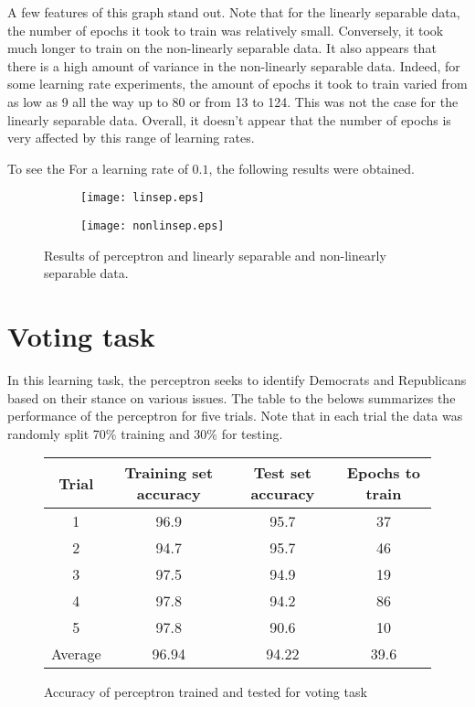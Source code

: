 \documentclass[12pt,letterpaper]{article}
\begin{document}
A few features of this graph stand out. Note that for the linearly separable data, the number of epochs it took to train was relatively small. Conversely, it took much longer to train on the non-linearly separable data. It also appears that there is a high amount of variance in the non-linearly separable data. Indeed, for some learning rate experiments, the amount of epochs it took to train varied from as low as 9 all the way up to 80 or from 13 to 124. This was not the case for the linearly separable data. Overall, it doesn't appear that the number of epochs is very affected by this range of learning rates.


To see the For a learning rate of $0.1$, the following results were obtained.

\begin{center}
\begin{figure}[H]
	\begin{subfigure}[h]{0.5\textwidth}
		\texttt{[image: linsep.eps]} 
	\end{subfigure}
	\begin{subfigure}[h]{0.5\textwidth}
		\texttt{[image: nonlinsep.eps]} 
	\end{subfigure}
\caption{Results of perceptron and linearly separable and non-linearly separable data.}
\end{figure}
\end{center}

\section*{Voting task}

In this learning task, the perceptron seeks to identify Democrats and Republicans based on their stance on various issues. The table to the belows summarizes the performance of the perceptron for five trials. Note that in each trial the data was randomly split 70\% training and 30\% for testing.

\begin{figure}[H]
\centering
\begin{tabular}{cccc}
\toprule
Trial	&	Training set accuracy	&	Test set accuracy 	&	Epochs to train\\
\hline
1	&	96.9	&	95.7	&	37\\
2	&	94.7	&	95.7	&	46\\
3	&	97.5	&	94.9	&	19\\
4	&	97.8	&	94.2	&	86\\
5	&	97.8	&	90.6	&	10\\
\hline
Average	&	96.94	&	94.22	&	39.6\\
\bottomrule
\end{tabular}
\caption{Accuracy of perceptron trained and tested for voting task}
\end{figure}
\end{document}
